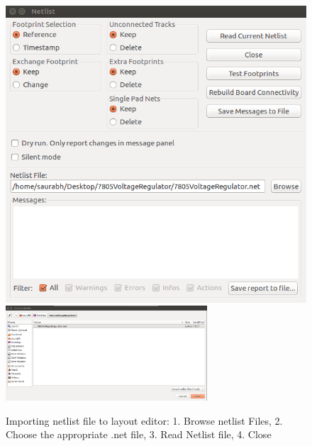 \begin{figure}
\centering
\includegraphics[width=0.67\linewidth]{manual_images/readnetlist.png}
\includegraphics[width=0.67\textwidth]{manual_images/browsenetlistforpcb.png}
\caption{Importing netlist file to layout editor: 1. Browse netlist
  Files, 2. Choose the appropriate .net file, 3. Read Netlist file, 4. Close}
\label{brnet}
\end{figure} 
 
